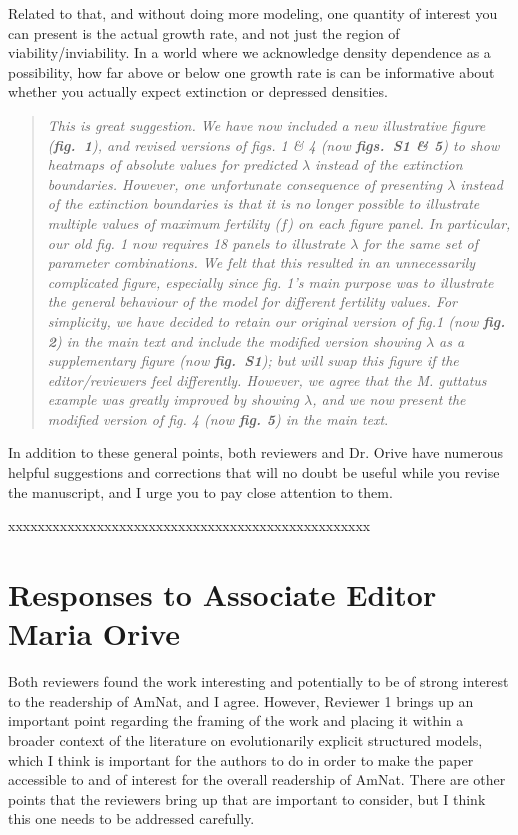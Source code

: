 \documentclass[11pt]{article}
\begin{document}
Related to that, and without doing more modeling, one quantity of interest you can present is the actual growth rate, and not just the region of viability/inviability. In a world where we acknowledge density dependence as a possibility, how far above or below one growth rate is can be informative about whether you actually expect extinction or depressed densities.

\begin{quote}
	{\itshape This is great suggestion. We have now included a new illustrative figure ({\bf fig.~1}), and revised versions of figs. 1 \& 4 (now {\bf figs.~S1 \& 5}) to show heatmaps of absolute values for predicted $\lambda$ instead of the extinction boundaries. However, one unfortunate consequence of presenting $\lambda$ instead of the extinction boundaries is that it is no longer possible to illustrate multiple values of maximum fertility ($f$) on each figure panel. In particular, our old fig. 1 now requires 18 panels to illustrate $\lambda$ for the same set of parameter combinations. We felt that this resulted in an unnecessarily complicated figure, especially since fig. 1's main purpose was to illustrate the general behaviour of the model for different fertility values. For simplicity, we have decided to retain our original version of fig.1 (now {\bf fig. 2}) in the main text and include the modified version showing $\lambda$ as a supplementary figure (now {\bf fig.~S1}); but will swap this figure if the editor/reviewers feel differently. However, we agree that the {\itshape M. guttatus} example was greatly improved by showing $\lambda$, and we now present the modified version of fig. 4 (now {\bf fig. 5}) in the main text}.
\end{quote}


In addition to these general points, both reviewers and Dr. Orive have numerous helpful suggestions and corrections that will no doubt be useful while you revise the manuscript, and I urge you to pay close attention to them.
\bigskip


\noindent xxxxxxxxxxxxxxxxxxxxxxxxxxxxxxxxxxxxxxxxxxxxxxxxx

\section*{Responses to Associate Editor Maria Orive}

Both reviewers found the work interesting and potentially to be of strong interest to the readership of AmNat, and I agree. However, Reviewer 1 brings up an important point regarding the framing of the work and placing it within a broader context of the literature on evolutionarily explicit structured models, which I think is important for the authors to do in order to make the paper accessible to and of interest for the overall readership of AmNat. There are other points that the reviewers bring up that are important to consider, but I think this one needs to be addressed carefully.
\end{document}
